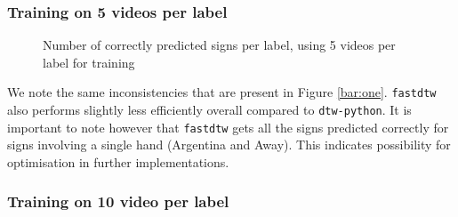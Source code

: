 \documentclass[final,rdr32.tex]{subfiles}
\begin{document}
\newpage


\subsubsection{Training on 5 videos per label}

\begin{figure}[H]
    \begin{center}
    \end{center}
    \caption{Number of correctly predicted signs per label, using 5 videos per label for training}
    \label{bar:two}
\end{figure}

We note the same inconsistencies that are present in Figure \ref{bar:one}. \verb|fastdtw| also performs slightly less efficiently overall compared to \verb|dtw-python|. It is important to note however that \verb|fastdtw| gets all the signs predicted correctly for signs involving a single hand (Argentina and Away). This indicates possibility for optimisation in further implementations.

\newpage

\subsubsection{Training on 10 video per label}
\end{document}

